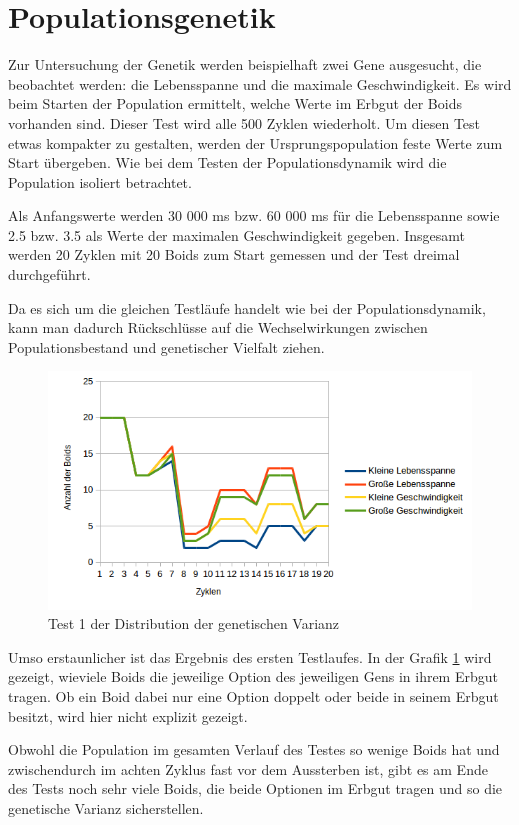 \documentclass[draft=false
              ,paper=a4
              ,twoside=false
              ,fontsize=11pt
              ,headsepline
              ,BCOR10mm
              ,DIV11
              ,bibtotoc
              ,liststotoc
              ]{scrbook}
\begin{document}
\section{Populationsgenetik}
Zur Untersuchung der Genetik werden beispielhaft zwei Gene ausgesucht, die beobachtet werden: die Lebensspanne und die maximale Geschwindigkeit.
Es wird beim Starten der Population ermittelt, welche Werte im Erbgut der Boids vorhanden sind. Dieser Test wird alle 500 Zyklen wiederholt. Um diesen Test etwas kompakter zu gestalten, werden der Ursprungspopulation feste Werte zum Start übergeben. Wie bei dem Testen der Populationsdynamik wird die Population isoliert betrachtet.

Als Anfangswerte werden 30 000 ms bzw. 60 000 ms für die Lebensspanne sowie 2.5 bzw. 3.5 als Werte der maximalen Geschwindigkeit gegeben. Insgesamt werden 20 Zyklen mit 20 Boids zum Start gemessen und der Test dreimal durchgeführt.

Da es sich um die gleichen Testläufe handelt wie bei der Populationsdynamik, kann man dadurch Rückschlüsse auf die Wechselwirkungen zwischen Populationsbestand und genetischer Vielfalt ziehen.

\begin{figure}[!h]
\centering
\includegraphics[scale=0.80]{project/Test1-Genetik.png}
\caption{Test 1 der Distribution der genetischen Varianz}
\label{test1genetik}
\end{figure}

Umso erstaunlicher ist das Ergebnis des ersten Testlaufes. In der Grafik \ref{test1genetik} wird gezeigt, wieviele Boids die jeweilige Option des jeweiligen Gens in ihrem Erbgut tragen. Ob ein Boid dabei nur eine Option doppelt oder beide in seinem Erbgut besitzt, wird hier nicht explizit gezeigt.

Obwohl die Population im gesamten Verlauf des Testes so wenige Boids hat und zwischendurch im achten Zyklus fast vor dem Aussterben ist, gibt es am Ende des Tests noch sehr viele Boids, die beide Optionen im Erbgut tragen und so die genetische Varianz sicherstellen.
\end{document}
